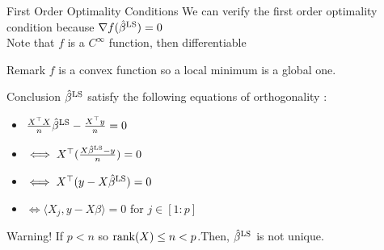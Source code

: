 \documentclass[unknownkeysallowed]{beamer}
\begin{document}
\begin{frame}
\begin{alertblock}{First Order Optimality Conditions}
We can verify the first order optimality condition because $\nabla{f(\hat\beta^{\rm LS})}=0$
\\
Note that $f$ is a $C^{\infty}$ function, then differentiable

\end{alertblock}

\begin{block}{Remark}
\rem $f$ is a convex function so a local minimum is a global one.
\end{block}

\begin{block}{Conclusion}
$\hat\beta^{\rm LS}$ satisfy the following equations of orthogonality :
\begin{itemize}
         \item $\frac{X^{\top}X}{n}\hat\beta^{\rm LS}-\frac{X^{\top}y}{n}=0$
        \item $\iff X^{\top}(\frac{X\hat\beta^{\rm LS}-y}{n})=0$
        \item $\iff X^{\top}(y-X\hat\beta^{\rm LS})=0$
        \item $\iff \langle X_{j},y-X\beta\rangle=0$ for $j \in [1:p]$
    \end{itemize}


\end{block}

\newpage


\begin{block}{Warning!}
If $p < n$ so ${\rm rank}(X) \leq n < p$.Then, $\hat{\beta}^{\rm LS}$ is not unique.
\end{block}


\end{frame}
\end{document}
